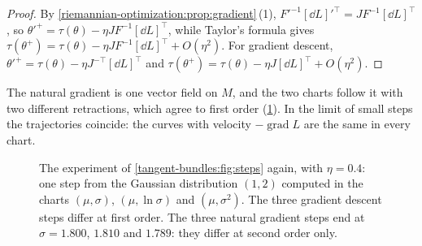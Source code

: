 \begin{notechapter}
\begin{proof}
By \cref{riemannian-optimization:prop:gradient}\,(1),
$F'^{-1}[\dd L]'^\top = JF^{-1}[\dd L]^\top$, so
$\theta'^+ = \tau(\theta) - \eta JF^{-1}[\dd L]^\top$, while Taylor's
formula gives
$\tau(\theta^+) = \tau(\theta) - \eta JF^{-1}[\dd L]^\top + O(\eta^2)$.
For gradient descent, $\theta'^+ = \tau(\theta) - \eta J^{-\top}[\dd L]^\top$
and $\tau(\theta^+) = \tau(\theta) - \eta J[\dd L]^\top + O(\eta^2)$.
\end{proof}

The natural gradient is one vector field on $M$, and the two charts
follow it with two different retractions, which agree to first order
(\cref{natural-gradient:fig:steps}). In the limit of small steps the
trajectories coincide: the curves with velocity
$-\operatorname{grad}L$ are the same in every chart.

\begin{figure}[ht]
\centering
{}
\caption{The experiment of \cref{tangent-bundles:fig:steps} again, with
$\eta = 0.4$: one step from the Gaussian distribution $(1, 2)$ computed
in the charts $(\mu, \sigma)$, $(\mu, \ln\sigma)$ and $(\mu, \sigma^2)$.
The three gradient descent steps differ at first order. The three
natural gradient steps end at $\sigma = 1.800$, $1.810$ and $1.789$: they
differ at second order only.}
\label{natural-gradient:fig:steps}
\end{figure}


\end{notechapter}
